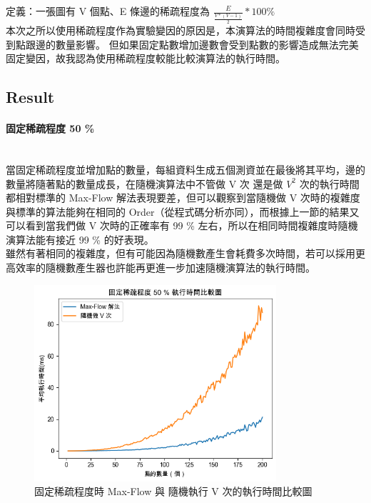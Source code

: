 \documentclass[12pt]{article}
\begin{document}
	定義：一張圖有 V 個點、E 條邊的稀疏程度為 $\frac{E}{\frac{V*(V-1)}{2}} * 100 \%$  \\
	
	本次之所以使用稀疏程度作為實驗變因的原因是，本演算法的時間複雜度會同時受到點跟邊的數量影響。
	但如果固定點數增加邊數會受到點數的影響造成無法完美固定變因，故我認為使用稀疏程度較能比較演算法的執行時間。
	
	
	\subsection{Result}
	
	\paragraph{固定稀疏程度 50 \%} \leavevmode \\
	
	當固定稀疏程度並增加點的數量，每組資料生成五個測資並在最後將其平均，邊的數量將隨著點的數量成長，在隨機演算法中不管做 V 次 還是做 $V^2$ 次的執行時間都相對標準的 Max-Flow 解法表現要差，但可以觀察到當隨機做 V 次時的複雜度與標準的算法能夠在相同的 Order（從程式碼分析亦同），而根據上一節的結果又可以看到當我們做 V 次時的正確率有 99 \% 左右，所以在相同時間複雜度時隨機演算法能有接近 99 \% 的好表現。 \\
	
	雖然有著相同的複雜度，但有可能因為隨機數產生會耗費多次時間，若可以採用更高效率的隨機數產生器也許能再更進一步加速隨機演算法的執行時間。
	
	\begin{figure}[H]
		\centering
		\includegraphics[width=0.8\textwidth]{img/img0}
		\caption{固定稀疏程度時 Max-Flow 與 隨機執行 V 次的執行時間比較圖}
		\label{Fig.0}
	\end{figure}
\end{document}
